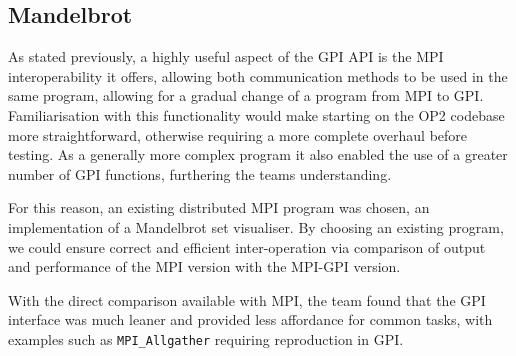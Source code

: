 \subsection{Mandelbrot}
As stated previously, a highly useful aspect of the GPI API is the MPI interoperability it offers, allowing both communication methods to be used in the same program, allowing for a gradual change of a program from MPI to GPI. Familiarisation with this functionality would make starting on the OP2 codebase more straightforward, otherwise requiring a more complete overhaul before testing. As a generally more complex program it also enabled the use of a greater number of GPI functions, furthering the teams understanding.

For this reason, an existing distributed MPI program was chosen, an implementation of a Mandelbrot set visualiser. By choosing an existing program, we could ensure correct and efficient inter-operation via comparison of output and performance of the MPI version with the MPI-GPI version.

With the direct comparison available with MPI, the team found that the GPI interface was much leaner and provided less affordance for common tasks, with examples such as \texttt{MPI\_Allgather} requiring reproduction in GPI.


